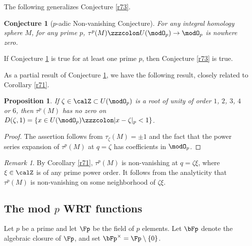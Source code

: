 \documentclass{amsart}
\numberwithin{equation}{section}
\numberwithin{figure}{section}
\theoremstyle{plain}
\newtheorem{proposition}[theorem]{Proposition}
\newtheorem{conjecture}[theorem]{Conjecture}
\theoremstyle{definition}
\theoremstyle{remark}
\newtheorem{remark}[theorem]{Remark}
\begin{document}
The following generalizes Conjecture \ref{r73}.

\begin{conjecture}[$p$-adic Non-vanishing Conjecture]
  \label{r33}
  For any integral homology sphere $M$, for any prime $p$,
  $\tau ^p(M)\zzzcolon U(\modO _p)\rightarrow \modO _p$ is nowhere zero.
\end{conjecture}

If Conjecture \ref{r33} is true for at least one prime $p$, then
Conjecture \ref{r73} is true.

As a partial result of Conjecture \ref{r33}, we have the following
result, closely related to Corollary \ref{r71}.

\begin{proposition}
  \label{r50}
  If $\zeta \in \calZ\subset U(\modO _p)$ is a root of unity of order $1$, $2$, $3$, $4$ or
  $6$, then $\tau ^p(M)$ has no zero on $D(\zeta ,1)=\{x\in U(\modO _p)\zzzcolon |x-\zeta |_p<1\}$.
\end{proposition}

\begin{proof}
  The assertion follows from $\tau _\zeta (M)=\pm 1$ and the fact that the
  power series expansion of $\tau ^p(M)$ at $q=\zeta $ has coefficients in
  $\modO _p$.
\end{proof}

\begin{remark}
  \label{r53}
  By Corollary \ref{r71}, $\tau ^p(M)$ is non-vanishing at $q=\zeta \xi $,
  where $\xi \in \calZ$ is of any prime power order.  It follows from the
  analyticity that $\tau ^p(M)$ is non-vanishing on some neighborhood of
  $\zeta \xi $.
\end{remark}

\subsection{The mod $p$ WRT functions}
\label{sec:mod-p-wrt}

Let $p$ be a prime and let $\Fp$ be the field of $p$ elements.  Let
$\bFp$ denote the algebraic closure of $\Fp$, and set
$\bFp^\times =\Fp\setminus \{0\}$.
\end{document}
